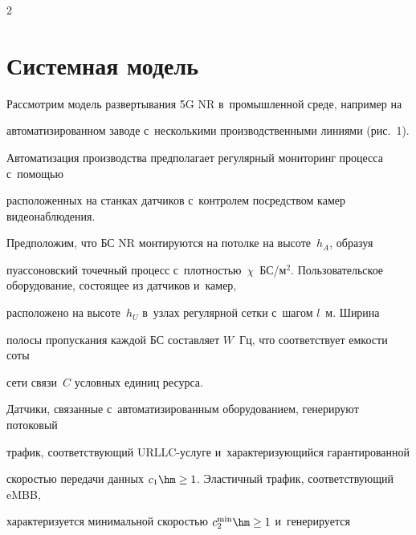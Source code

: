 \begin{multicols}{2}
\vspace*{-6pt}





\section{Системная модель}







\vspace*{-3pt}





Рассмотрим модель развертывания 5G NR в~промышленной среде, например на 


автоматизированном заводе с~несколькими производственными линиями (рис.~1). 


Автоматизация производства предполагает регулярный мониторинг процесса с~по\-мощью 


расположенных на станках датчиков с~контролем посредством камер видеонаблюдения. 


Предположим, что БС NR монтируются на потолке на высоте~$h_A$, образуя 


пуассоновский точечный процесс с~плотностью~$\chi$~БС/$\text{м}^2$. Пользовательское оборудование, состоящее из датчиков и~камер, 


расположено на высоте~$h_U$ в~узлах регулярной сетки с~шагом $l$~м. Ширина 


полосы пропускания каждой БС составляет $W$~Гц, что соответствует емкости соты 


сети связи~$C$ условных единиц ре\-сурса.


{





}











Датчики, связанные с~автоматизированным оборудованием, генерируют потоковый 


трафик, соответствующий  URLLC-услуге и~ха\-рак\-те\-ри\-зу\-ющий\-ся гарантированной 


скоростью передачи данных $c_1 \hm\geq 1$. Эластичный трафик, соответствующий eMBB, 


характеризуется минимальной скоростью $c_2^{\min} \hm\geq 1$ и~генерируется 



\end{multicols}
